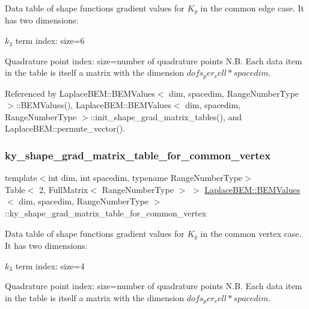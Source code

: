 Data table of shape function\textquotesingle{}s gradient values for $K_y$ in the common edge case. It has two dimensions\+:
\begin{DoxyEnumerate}
\item $k_3$ term index\+: size=6
\item Quadrature point index\+: size=number of quadrature points N.\+B. Each data item in the table is itself a matrix with the dimension $dofs_per_cell*spacedim$. 
\end{DoxyEnumerate}

Referenced by Laplace\+B\+E\+M\+::\+B\+E\+M\+Values$<$ dim, spacedim, Range\+Number\+Type $>$\+::\+B\+E\+M\+Values(), Laplace\+B\+E\+M\+::\+B\+E\+M\+Values$<$ dim, spacedim, Range\+Number\+Type $>$\+::init\+\_\+shape\+\_\+grad\+\_\+matrix\+\_\+tables(), and Laplace\+B\+E\+M\+::permute\+\_\+vector().

\mbox{\label{classLaplaceBEM_1_1BEMValues_ac9cf75ccfd80b75decfa4e36d4de3f73}} 
\subsubsection{\texorpdfstring{ky\+\_\+shape\+\_\+grad\+\_\+matrix\+\_\+table\+\_\+for\+\_\+common\+\_\+vertex}{ky\_shape\_grad\_matrix\_table\_for\_common\_vertex}}
{\footnotesize\ttfamily template$<$int dim, int spacedim, typename Range\+Number\+Type$>$ \\
Table$<$ 2, Full\+Matrix$<$ Range\+Number\+Type $>$ $>$ \hyperlink{classLaplaceBEM_1_1BEMValues}{Laplace\+B\+E\+M\+::\+B\+E\+M\+Values}$<$ dim, spacedim, Range\+Number\+Type $>$\+::ky\+\_\+shape\+\_\+grad\+\_\+matrix\+\_\+table\+\_\+for\+\_\+common\+\_\+vertex}

Data table of shape function\textquotesingle{}s gradient values for $K_y$ in the common vertex case. It has two dimensions\+:
\begin{DoxyEnumerate}
\item $k_3$ term index\+: size=4
\item Quadrature point index\+: size=number of quadrature points N.\+B. Each data item in the table is itself a matrix with the dimension $dofs_per_cell*spacedim$. 
\end{DoxyEnumerate}

